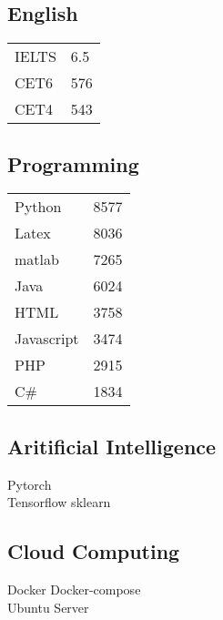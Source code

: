 \documentclass[]{deedy-resume-openfont}
\begin{document}
\begin{minipage}[t]{0.25\textwidth}
\subsection{English}
\begin{tabular}{ll}
    IELTS & 6.5 \\
    CET6  & 576 \\
    CET4  & 543 \\
\end{tabular}
\sectionsep
\subsection{Programming }
\begin{tabular}{ll}
    Python     & 8577  \\
    Latex      & 8036  \\
    matlab     & 7265  \\
    Java       & 6024  \\
    HTML       & 3758  \\
    Javascript & 3474  \\
    PHP        & 2915  \\
    C\#        & 1834  \\
\end{tabular}
\sectionsep

\subsection{Aritificial Intelligence}
Pytorch \\
Tensorflow \textbullet{} sklearn \\
\sectionsep

\subsection{Cloud Computing}
Docker \textbullet{} Docker-compose \\
Ubuntu Server \\

\end{minipage} 
\hfill
\end{document}
